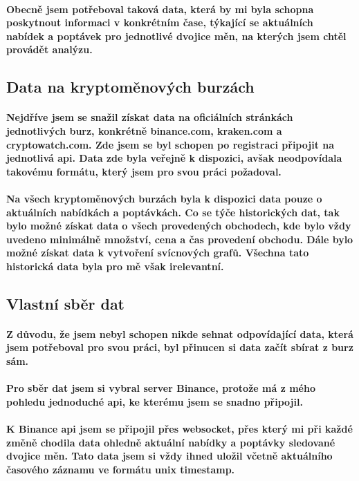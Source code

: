 \documentclass[thesis=B,czech]{FITthesis}[2019/03/21]
\begin{document}
\paragraph{
Obecně jsem potřeboval  taková data, která by mi byla schopna poskytnout informaci v konkrétním čase, týkající se aktuálních nabídek a poptávek pro jednotlivé dvojice měn, na kterých jsem chtěl provádět analýzu.
}
\subsection{Data na kryptoměnových burzách}
\paragraph{
Nejdříve jsem se snažil získat data na oficiálních stránkách jednotlivých burz, konkrétně binance.com, kraken.com a cryptowatch.com. Zde jsem se byl schopen po registraci připojit na jednotlivá api. Data zde byla veřejně k dispozici, avšak neodpovídala takovému formátu, který jsem pro svou práci požadoval. 
}
\paragraph{
Na všech kryptoměnových burzách byla k dispozici data pouze o aktuálních nabídkách a poptávkách. Co se týče historických dat, tak bylo možné získat data o všech provedených obchodech, kde bylo vždy uvedeno minimálně množství, cena a čas provedení obchodu. Dále bylo možné získat data k vytvoření svícnových grafů. Všechna tato historická data byla pro mě však irelevantní. 
}
\subsection{Vlastní sběr dat}
\paragraph{
Z důvodu, že jsem nebyl schopen nikde sehnat odpovídající data, která jsem potřeboval pro svou práci, byl přinucen si data začít sbírat z burz sám.
}
\paragraph{
Pro sběr dat jsem si vybral server Binance, protože má z mého pohledu jednoduché api, ke kterému jsem se snadno připojil. \cite{Binance api}
}
\paragraph{
K Binance api jsem se připojil přes websocket, přes který mi při každé změně chodila data ohledně aktuální nabídky a poptávky sledované dvojice měn. Tato data jsem si vždy ihned uložil včetně aktuálního časového záznamu ve formátu unix timestamp.
}
\end{document}
